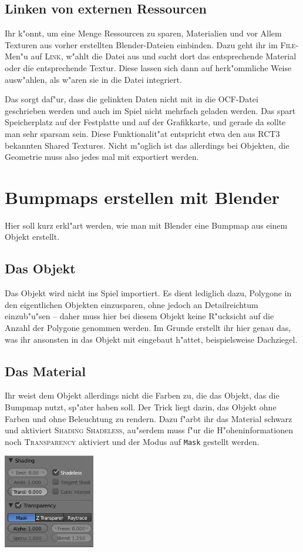 \documentclass[a4paper]{article}
\newcommand{\ccaption}[1]{\textsc{#1}}
\newcommand{\cvalue}[1]{\texttt{#1}}
\newcommand{\rarrow}{\textrightarrow}
\begin{document}
\subsection{Linken von externen Ressourcen}
Ihr k"onnt, um eine Menge Ressourcen zu sparen, Materialien und vor Allem Texturen aus vorher erstellten Blender-Dateien einbinden. Dazu geht ihr
im \ccaption{File}-Men"u auf \ccaption{Link}, w"ahlt die Datei aus und sucht dort das entsprechende Material oder die entsprechende Textur. Diese lassen
sich dann auf herk"ommliche Weise ausw"ahlen, als w"aren sie in die Datei integriert.

Das sorgt daf"ur, dass die gelinkten Daten nicht mit in die OCF-Datei geschrieben werden und auch im Spiel nicht mehrfach geladen werden. Das spart
Speicherplatz auf der Festplatte und auf der Grafikkarte, und gerade da sollte man sehr sparsam sein. Diese Funktionalit"at entspricht etwa
den aus RCT3 bekannten Shared Textures. Nicht m"oglich ist das allerdings bei Objekten, die Geometrie muss also jedes mal mit exportiert werden.

\section{Bumpmaps erstellen mit Blender}
\label{bumpmaps}
Hier soll kurz erkl"art werden, wie man mit Blender eine Bumpmap aus einem Objekt erstellt.

\subsection{Das Objekt}
Das Objekt wird nicht ins Spiel importiert. Es dient lediglich dazu, Polygone in den eigentlichen Objekten einzusparen, ohne jedoch an Detailreichtum
einzub"u"sen -- daher muss hier bei diesem Objekt keine R"ucksicht auf die Anzahl der Polygone genommen werden. Im Grunde erstellt ihr hier genau das, was
ihr ansonsten in das Objekt mit eingebaut h"attet, beispielsweise Dachziegel.

\subsection{Das Material}
Ihr weist dem Objekt allerdings nicht die Farben zu, die das Objekt, das die Bumpmap nutzt, sp"ater haben soll. Der Trick liegt darin, das Objekt ohne
Farben und ohne Beleuchtung zu rendern. Dazu f"arbt ihr das Material schwarz und aktiviert \ccaption{Shading \rarrow Shadeless}, au"serdem muss f"ur die
H"oheninformationen noch \ccaption{Transparency} aktiviert und der Modus auf \cvalue{Mask} gestellt werden.
\begin{center}
\includegraphics[width=40mm]{../images/blender/bumpmap-material.png}
\end{center}
\end{document}
